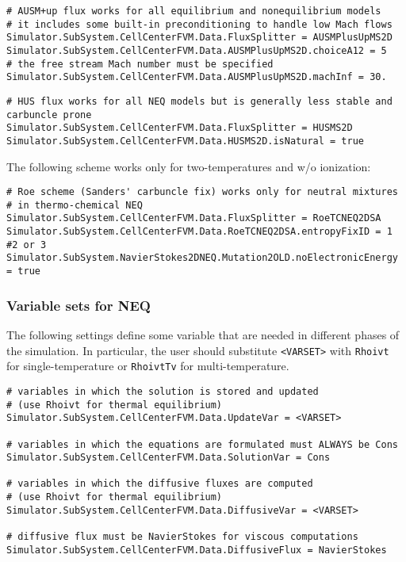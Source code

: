 \documentclass[11pt]{article}
\begin{document}
\begin{verbatim}
# AUSM+up flux works for all equilibrium and nonequilibrium models
# it includes some built-in preconditioning to handle low Mach flows
Simulator.SubSystem.CellCenterFVM.Data.FluxSplitter = AUSMPlusUpMS2D
Simulator.SubSystem.CellCenterFVM.Data.AUSMPlusUpMS2D.choiceA12 = 5
# the free stream Mach number must be specified
Simulator.SubSystem.CellCenterFVM.Data.AUSMPlusUpMS2D.machInf = 30.
\end{verbatim}

\begin{verbatim}
# HUS flux works for all NEQ models but is generally less stable and carbuncle prone
Simulator.SubSystem.CellCenterFVM.Data.FluxSplitter = HUSMS2D
Simulator.SubSystem.CellCenterFVM.Data.HUSMS2D.isNatural = true
\end{verbatim}

The following scheme works only for two-temperatures and w/o ionization:
\begin{verbatim}
# Roe scheme (Sanders' carbuncle fix) works only for neutral mixtures
# in thermo-chemical NEQ
Simulator.SubSystem.CellCenterFVM.Data.FluxSplitter = RoeTCNEQ2DSA 
Simulator.SubSystem.CellCenterFVM.Data.RoeTCNEQ2DSA.entropyFixID = 1  #2 or 3 
Simulator.SubSystem.NavierStokes2DNEQ.Mutation2OLD.noElectronicEnergy = true
\end{verbatim}

\subsubsection{Variable sets for NEQ}

The following settings define some variable that are needed in different phases of the simulation.
In particular, the user should substitute {\tt <VARSET>} with {\tt Rhoivt} for single-temperature or {\tt RhoivtTv} for multi-temperature.

\begin{verbatim}
# variables in which the solution is stored and updated 
# (use Rhoivt for thermal equilibrium)
Simulator.SubSystem.CellCenterFVM.Data.UpdateVar = <VARSET>

# variables in which the equations are formulated must ALWAYS be Cons
Simulator.SubSystem.CellCenterFVM.Data.SolutionVar = Cons

# variables in which the diffusive fluxes are computed 
# (use Rhoivt for thermal equilibrium)
Simulator.SubSystem.CellCenterFVM.Data.DiffusiveVar = <VARSET>

# diffusive flux must be NavierStokes for viscous computations
Simulator.SubSystem.CellCenterFVM.Data.DiffusiveFlux = NavierStokes
\end{verbatim}
\end{document}
